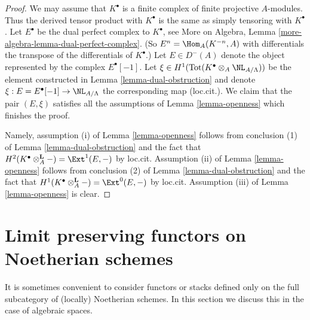 \begin{proof}
We may assume that $K^\bullet$ is a finite complex of finite projective
$A$-modules. Thus the derived tensor product with $K^\bullet$ is the
same as simply tensoring with $K^\bullet$. Let
$E^\bullet$ be the dual perfect complex to $K^\bullet$, see
More on Algebra, Lemma \ref{more-algebra-lemma-dual-perfect-complex}.
(So $E^n = \Hom_A(K^{-n}, A)$ with differentials the transpose of the
differentials of $K^\bullet$.) Let $E \in D^{-}(A)$ denote the
object represented by the complex $E^\bullet[-1]$.
Let $\xi \in H^1(\text{Tot}(K^\bullet \otimes_A \NL_{A/\Lambda}))$
be the element constructed in Lemma \ref{lemma-dual-obstruction}
and denote $\xi : E = E^\bullet[-1] \to \NL_{A/\Lambda}$ the corresponding
map (loc.cit.). We claim that the pair $(E, \xi)$ satisfies all the
assumptions of Lemma \ref{lemma-openness} which finishes the proof.

\medskip\noindent
Namely, assumption (i) of Lemma \ref{lemma-openness} follows from conclusion
(1) of Lemma \ref{lemma-dual-obstruction}
and the fact that $H^2(K^\bullet \otimes_A^\mathbf{L} -) =
\Ext^1(E, -)$ by loc.cit. Assumption (ii) of
Lemma \ref{lemma-openness} follows from conclusion (2) of
Lemma \ref{lemma-dual-obstruction}
and the fact that $H^1(K^\bullet \otimes_A^\mathbf{L} -) =
\Ext^0(E, -)$ by loc.cit. Assumption (iii) of Lemma \ref{lemma-openness}
is clear.
\end{proof}







\section{Limit preserving functors on Noetherian schemes}
\label{section-noetherian}

\noindent
It is sometimes convenient to consider functors or stacks defined only
on the full subcategory of (locally) Noetherian schemes. In this section
we discuss this in the case of algebraic spaces.

